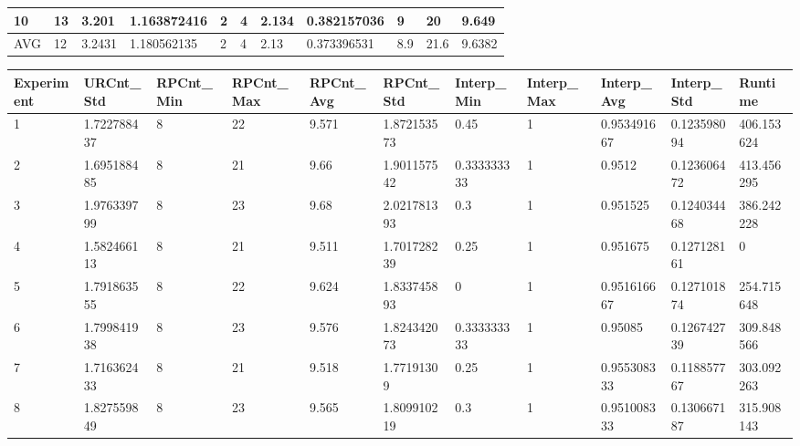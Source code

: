 \begin{table}[H]
\begin{adjustbox}{max width=380pt,keepaspectratio,angle=90}
\begin{tabular}{|l|l|l|l|l|l|l|l|l|l|l|}
						10         & 13        & 3.201     & 1.163872416 & 2            & 4            & 2.134        & 0.382157036  & 9          & 20         & 9.649      \\ \hline\hline
						AVG        & 12        & 3.2431    & 1.180562135 & 2            & 4            & 2.13         & 0.373396531  & 8.9        & 21.6       & 9.6382     \\ \hline
					\end{tabular}	
				\end{adjustbox}
				\begin{adjustbox}{max width=380pt,keepaspectratio,angle=90}
					\begin{tabular}{|l|l|l|l|l|l|l|l|l|l|l|}
						\rowcolor[HTML]{EFEFEF} 
						\hline
						Experiment & URCnt\_Std  & RPCnt\_Min & RPCnt\_Max & RPCnt\_Avg & RPCnt\_Std  & Interp\_Min & Interp\_Max & Interp\_Avg & Interp\_Std & Runtime     \\ \hline
						1          & 1.722788437 & 8          & 22         & 9.571      & 1.872153573 & 0.45        & 1           & 0.953491667 & 0.123598094 & 406.153624  \\ \hline
						2          & 1.695188485 & 8          & 21         & 9.66       & 1.901157542 & 0.333333333 & 1           & 0.9512      & 0.123606472 & 413.456295  \\ \hline
						3          & 1.976339799 & 8          & 23         & 9.68       & 2.021781393 & 0.3         & 1           & 0.951525    & 0.124034468 & 386.242228  \\ \hline
						4          & 1.582466113 & 8          & 21         & 9.511      & 1.701728239 & 0.25        & 1           & 0.951675    & 0.127128161 & 0           \\ \hline
						5          & 1.791863555 & 8          & 22         & 9.624      & 1.833745893 & 0           & 1           & 0.951616667 & 0.127101874 & 254.715648  \\ \hline
						6          & 1.799841938 & 8          & 23         & 9.576      & 1.824342073 & 0.333333333 & 1           & 0.95085     & 0.126742739 & 309.848566  \\ \hline
						7          & 1.716362433 & 8          & 21         & 9.518      & 1.77191309  & 0.25        & 1           & 0.955308333 & 0.118857767 & 303.092263  \\ \hline
						8          & 1.827559849 & 8          & 23         & 9.565      & 1.809910219 & 0.3         & 1           & 0.951008333 & 0.130667187 & 315.908143  \\ \hline

\end{tabular}
\end{adjustbox}
\end{table}
